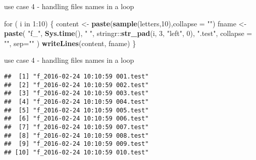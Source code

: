 \documentclass[ignorenonframetext,]{beamer}
\newenvironment{Shaded}{\begin{snugshade}}{\end{snugshade}}
\newcommand{\KeywordTok}[1]{\textcolor[rgb]{0.13,0.29,0.53}{\textbf{{#1}}}}
\newcommand{\DataTypeTok}[1]{\textcolor[rgb]{0.13,0.29,0.53}{{#1}}}
\newcommand{\DecValTok}[1]{\textcolor[rgb]{0.00,0.00,0.81}{{#1}}}
\newcommand{\CharTok}[1]{\textcolor[rgb]{0.31,0.60,0.02}{{#1}}}
\newcommand{\StringTok}[1]{\textcolor[rgb]{0.31,0.60,0.02}{{#1}}}
\newcommand{\NormalTok}[1]{{#1}}
\begin{document}
\begin{frame}[fragile]{use case 4 - handling files names in a loop}

\begin{Shaded}
\begin{Highlighting}[]
\NormalTok{for ( i in }\DecValTok{1}\NormalTok{:}\DecValTok{10}\NormalTok{) \{}
  \NormalTok{content <-}\StringTok{ }\KeywordTok{paste}\NormalTok{(}\KeywordTok{sample}\NormalTok{(letters,}\DecValTok{10}\NormalTok{),}\DataTypeTok{collapse =} \StringTok{""}\NormalTok{)}
  \NormalTok{fname   <-}\StringTok{ }
\StringTok{    }\KeywordTok{paste}\NormalTok{(}
      \StringTok{"f_"}\NormalTok{, }
      \KeywordTok{Sys.time}\NormalTok{(), }\StringTok{" "}\NormalTok{, }
      \NormalTok{stringr::}\KeywordTok{str_pad}\NormalTok{(i, }\DecValTok{3}\NormalTok{, }\StringTok{"left"}\NormalTok{, }\DecValTok{0}\NormalTok{),  }
      \StringTok{".test"}\NormalTok{,}
      \DataTypeTok{collapse =} \StringTok{""}\NormalTok{, }\DataTypeTok{sep=}\StringTok{""}
    \NormalTok{)}
  \KeywordTok{writeLines}\NormalTok{(content, fname)}
\NormalTok{\}}
\end{Highlighting}
\end{Shaded}

\end{frame}

\begin{frame}[fragile]{use case 4 - handling files names in a loop}

\begin{Shaded}
\end{Shaded}

\begin{verbatim}
##  [1] "f_2016-02-24 10:10:59 001.test"
##  [2] "f_2016-02-24 10:10:59 002.test"
##  [3] "f_2016-02-24 10:10:59 003.test"
##  [4] "f_2016-02-24 10:10:59 004.test"
##  [5] "f_2016-02-24 10:10:59 005.test"
##  [6] "f_2016-02-24 10:10:59 006.test"
##  [7] "f_2016-02-24 10:10:59 007.test"
##  [8] "f_2016-02-24 10:10:59 008.test"
##  [9] "f_2016-02-24 10:10:59 009.test"
## [10] "f_2016-02-24 10:10:59 010.test"
\end{verbatim}

\end{frame}
\end{document}
